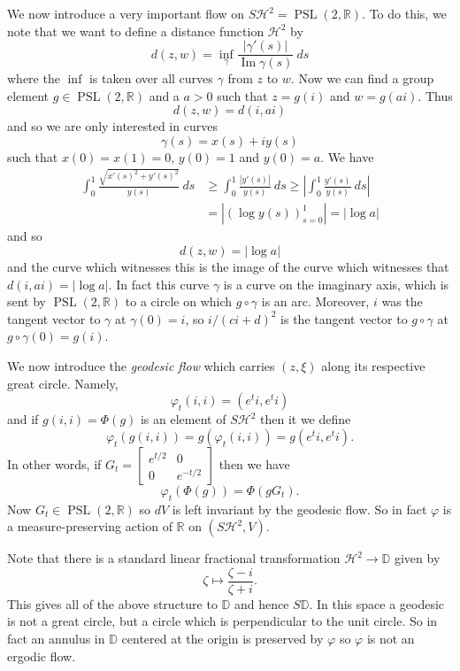 \documentclass[12pt]{report}
\newcommand{\RR}{\mathbb{R}}
\newcommand{\DD}{\mathbb{D}}
\newcommand{\HH}{\mathcal H}
\newcommand{\PSL}{\operatorname{PSL}}
\renewcommand{\Im}{\operatorname{Im}}
\newcommand{\dfn}[1]{\emph{#1}\index{#1}}
\theoremstyle{definition}
\begin{document}
We now introduce a very important flow on $S\HH^2 = \PSL(2, \RR)$. To do this, we note that we want to define a distance function $\HH^2$ by
$$d(z, w) = \inf_\gamma \frac{|\gamma'(s)|}{\Im \gamma(s)} ~ds$$
where the $\inf$ is taken over all curves $\gamma$ from $z$ to $w$.
Now we can find a group element $g \in \PSL(2, \RR)$ and a $a > 0$ such that $z = g(i)$ and $w = g(ai)$. Thus
$$d(z, w) = d(i, ai)$$
and so we are only interested in curves
$$\gamma(s) = x(s) + iy(s)$$
such that $x(0) = x(1) = 0$, $y(0) = 1$ and $y(0) = a$. We have
\begin{align*}\int_0^1 \frac{\sqrt{x'(s)^2 + y'(s)^2}}{y(s)} ~ds &\geq \int_0^1 \frac{|y'(s)|}{y(s)} ~ds \geq \left|\int_0^1 \frac{y'(s)}{y(s)} ~ds\right|
\\&= |(\log y(s))_{s=0}^1| = |\log a|
\end{align*}
and so
$$d(z, w) = |\log a|$$
and the curve which witnesses this is the image of the curve which witnesses that $d(i, ai) = |\log a|$.
In fact this curve $\gamma$ is a curve on the imaginary axis, which is sent by $\PSL(2, \RR)$ to a circle on which $g \circ \gamma$ is an arc.
Moreover, $i$ was the tangent vector to $\gamma$ at $\gamma(0) = i$, so $i/(ci + d)^2$ is the tangent vector to $g \circ \gamma$ at $g \circ \gamma(0) = g(i)$.

We now introduce the \dfn{geodesic flow} which carries $(z, \xi)$ along its respective great circle. Namely,
$$\varphi_t(i, i) = (e^ti, e^ti)$$
and if $g(i, i) = \Phi(g)$ is an element of $S\HH^2$ then it we define
$$\varphi_t(g(i, i)) = g(\varphi_t(i, i)) = g(e^ti, e^ti).$$
In other words, if $G_t = \begin{bmatrix}e^{t/2}&0\\0&e^{-t/2}\end{bmatrix}$ then we have
$$\varphi_t(\Phi(g)) = \Phi(gG_t).$$
Now $G_t \in \PSL(2, \RR)$ so $dV$ is left invariant by the geodesic flow.
So in fact $\varphi$ is a measure-preserving action of $\RR$ on $(S\HH^2, V)$.

Note that there is a standard linear fractional transformation $\HH^2 \to \DD$ given by
$$\zeta \mapsto \frac{\zeta - i}{\zeta + i}.$$
This gives all of the above structure to $\DD$ and hence $S\DD$.
In this space a geodesic is not a great circle, but a circle which is perpendicular to the unit circle.
So in fact an annulus in $\DD$ centered at the origin is preserved by $\varphi$ so $\varphi$ is not an ergodic flow.
\end{document}

